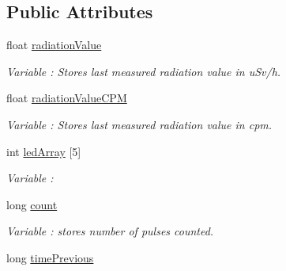 \subsection*{Public Attributes}
\begin{DoxyCompactItemize}
\item 
float \hyperlink{class_wasp_radiation_board_a41fd121b8ba686e7d36c290a8353cacd}{radiation\+Value}\hypertarget{class_wasp_radiation_board_a41fd121b8ba686e7d36c290a8353cacd}{}\label{class_wasp_radiation_board_a41fd121b8ba686e7d36c290a8353cacd}

\begin{DoxyCompactList}\small\item\em Variable \+: Stores last measured radiation value in u\+Sv/h. \end{DoxyCompactList}\item 
float \hyperlink{class_wasp_radiation_board_ad3c9b4bd902226956a2af547c8edb97e}{radiation\+Value\+C\+PM}\hypertarget{class_wasp_radiation_board_ad3c9b4bd902226956a2af547c8edb97e}{}\label{class_wasp_radiation_board_ad3c9b4bd902226956a2af547c8edb97e}

\begin{DoxyCompactList}\small\item\em Variable \+: Stores last measured radiation value in cpm. \end{DoxyCompactList}\item 
int \hyperlink{class_wasp_radiation_board_a14b54c591772f5afb977cecae3a293d7}{led\+Array} \mbox{[}5\mbox{]}\hypertarget{class_wasp_radiation_board_a14b54c591772f5afb977cecae3a293d7}{}\label{class_wasp_radiation_board_a14b54c591772f5afb977cecae3a293d7}

\begin{DoxyCompactList}\small\item\em Variable \+: \end{DoxyCompactList}\item 
long \hyperlink{class_wasp_radiation_board_a3203869ee972c1c3e9926a68b140070b}{count}\hypertarget{class_wasp_radiation_board_a3203869ee972c1c3e9926a68b140070b}{}\label{class_wasp_radiation_board_a3203869ee972c1c3e9926a68b140070b}

\begin{DoxyCompactList}\small\item\em Variable \+: stores number of pulses counted. \end{DoxyCompactList}\item 
long \hyperlink{class_wasp_radiation_board_a1ae47207bed87644ae0128d8d983ae46}{time\+Previous}\hypertarget{class_wasp_radiation_board_a1ae47207bed87644ae0128d8d983ae46}{}\label{class_wasp_radiation_board_a1ae47207bed87644ae0128d8d983ae46}


\end{DoxyCompactItemize}
